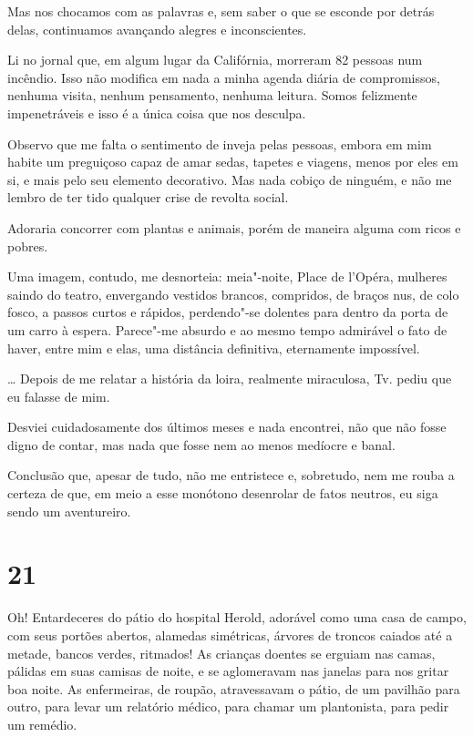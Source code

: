 Mas nos chocamos com as palavras e, sem saber o que se esconde por
detrás delas, continuamos avançando alegres e inconscientes.

Li no jornal que, em algum lugar da Califórnia, morreram 82 pessoas num
incêndio. Isso não modifica em nada a minha agenda diária de
compromissos, nenhuma visita, nenhum pensamento, nenhuma leitura. Somos
felizmente impenetráveis e isso é a única coisa que nos desculpa.

\asterisc

Observo que me falta o sentimento de inveja pelas pessoas, embora em mim
habite um preguiçoso capaz de amar sedas, tapetes e viagens, menos por
eles em si, e mais pelo seu elemento decorativo. Mas nada cobiço de
ninguém, e não me lembro de ter tido qualquer crise de revolta social.

Adoraria concorrer com plantas e animais, porém de maneira alguma com
ricos e pobres.

Uma imagem, contudo, me desnorteia: meia"-noite, Place de l'Opéra,
mulheres saindo do teatro, envergando vestidos brancos, compridos, de
braços nus, de colo fosco, a passos curtos e rápidos, perdendo"-se
dolentes para dentro da porta de um carro à espera. Parece"-me absurdo e
ao mesmo tempo admirável o fato de haver, entre mim e elas, uma
distância definitiva, eternamente impossível.

\asterisc

\ldots{} Depois de me relatar a história da loira, realmente miraculosa,
Tv. pediu que eu falasse de mim.

Desviei cuidadosamente dos últimos meses e nada encontrei, não que não
fosse digno de contar, mas nada que fosse nem ao menos medíocre e banal.

Conclusão que, apesar de tudo, não me entristece e, sobretudo, nem me
rouba a certeza de que, em meio a esse monótono desenrolar de fatos
neutros, eu siga sendo um aventureiro.

\section{21}

Oh! Entardeceres do pátio do hospital Herold, adorável como uma casa de
campo, com seus portões abertos, alamedas simétricas, árvores de troncos
caiados até a metade, bancos verdes, ritmados! As crianças doentes se
erguiam nas camas, pálidas em suas camisas de noite, e se aglomeravam
nas janelas para nos gritar boa noite. As enfermeiras, de roupão,
atravessavam o pátio, de um pavilhão para outro, para levar um relatório
médico, para chamar um plantonista, para pedir um remédio.

